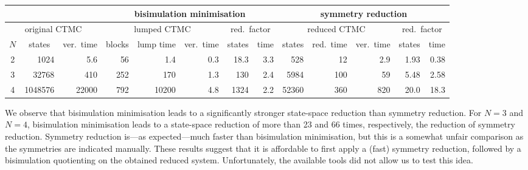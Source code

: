 \documentclass{llncs}
\begin{document}
{\scriptsize
\begin{center}
\begin{tabular}{|c|r|r|r|r|r|r|r|r|r|r|r|r|}
\hline 
  \multicolumn{3}{|c|}{} & \multicolumn{5}{c|}{bisimulation minimisation}
  & \multicolumn{5}{c|}{symmetry reduction} \\ \hline
  \multicolumn{3}{|c|}{original CTMC} & \multicolumn{3}{c|}{lumped CTMC}  
  & \multicolumn{2}{c|}{red.\ factor}  & \multicolumn{3}{c|}{reduced CTMC}  
  & \multicolumn{2}{c|}{red.\ factor} \\[1ex] \hline 
$N$& \multicolumn{1}{c|}{states} & ver.\ time    &blocks& lump time     & ver.\ time     & \multicolumn{1}{c|}{states} & time       &states&red.\ time& ver.\ time & states & \multicolumn{1}{c|}{time} \\ \hline
2&   1024&    5.6          & 56&    1.4          &   0.3          & 18.3           &3.3 &  528& 12&  2.9          & 1.93          & 0.38 \\
3&  32768&  410\phantom{.0}&252&  170\phantom{.0}&   1.3          & 130\phantom{.0}&2.4 & 5984&100& 59\phantom{.0}& 5.48          & 2.58 \\
4&1048576&22000\phantom{.0}&792&10200\phantom{.0}&   4.8          &1324\phantom{.0}&2.2 &52360&360&820\phantom{.0}&20.0\phantom{0}& 18.3\phantom{0} \\ \hline
\end{tabular}
\end{center}
}
\noindent
We observe that bisimulation minimisation leads to a significantly stronger state-space reduction
than symmetry reduction. 
For $N = 3$ and $N = 4$, bisimulation minimisation leads to a state-space reduction of more than
23 and 66 times, respectively, the reduction of symmetry reduction.
Symmetry reduction is---as expected---much faster than bisimulation minimisation, but this is a
somewhat unfair comparison as the symmetries are indicated manually.
These results suggest that it is affordable to first apply a (fast) symmetry reduction, followed by 
a bisimulation quotienting on the obtained reduced system.
Unfortunately, the available tools did not allow us to test this idea.
\end{document}
